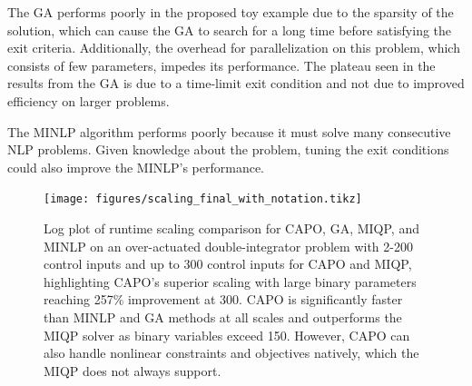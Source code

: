 The GA performs poorly in the proposed toy example due to the sparsity of the solution, which can cause the GA to search for a long time before satisfying the exit criteria. Additionally, the overhead for parallelization on this problem, which consists of few parameters, impedes its performance. The plateau seen in the results from the GA is due to a time-limit exit condition and not due to improved efficiency on larger problems.

The MINLP algorithm performs poorly because it must solve many consecutive NLP problems. Given knowledge about the problem, tuning the exit conditions could also improve the MINLP's performance. 



\begin{figure}
    \centering
    \texttt{[image: figures/scaling\_final\_with\_notation.tikz]}
    \caption{Log plot of runtime scaling comparison for CAPO, GA, MIQP, and MINLP on an over-actuated double-integrator problem with 2-200 control inputs and up to 300 control inputs for CAPO and MIQP, highlighting CAPO's superior scaling with large binary parameters reaching 257\% improvement at 300. CAPO is significantly faster than MINLP and GA methods at all scales and outperforms the MIQP solver as binary variables exceed 150. However, CAPO can also handle nonlinear constraints and objectives natively, which the MIQP does not always support.}
    \label{fig:time_scaling}

\end{figure}

